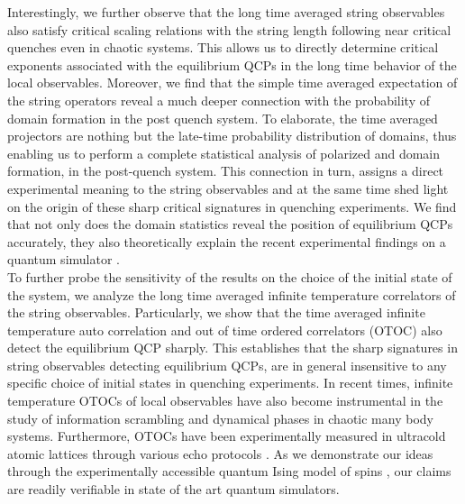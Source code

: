 \documentclass[aps,prx,twocolumn]{revtex4-2}
\begin{document}
 Interestingly, we further observe that the long time averaged string observables also satisfy critical scaling relations with the string length  following near critical quenches even in chaotic systems. This allows us to directly determine critical exponents associated with the equilibrium QCPs in the long time behavior of the local observables. Moreover, we find that the simple time averaged expectation of the string operators reveal a much deeper connection with the probability of domain formation in the post quench system. To elaborate, the time averaged projectors are nothing but the late-time probability distribution of domains, thus enabling us to perform a complete statistical analysis of polarized and   domain formation, in the post-quench system. This connection in turn, assigns a direct experimental meaning to the string observables and at the same time shed light on the origin of these sharp critical signatures in quenching experiments. We find that not only does the domain statistics reveal the position of equilibrium QCPs accurately, they also theoretically explain the recent experimental findings \cite{Zhang2017} on a quantum simulator \cite{monroe03}.\\
 
  To further probe the sensitivity of the results on the choice of the initial state of the system, we analyze the long time averaged infinite temperature correlators of the string observables. Particularly, we show that the time averaged infinite temperature auto correlation and out of time ordered correlators (OTOC) also detect the equilibrium QCP sharply. This establishes that the sharp signatures in string observables detecting equilibrium QCPs, are in general insensitive to any specific choice of initial states in quenching experiments. In recent times, infinite temperature OTOCs of local observables have also become instrumental in the study of information scrambling \cite{maldacena16,swingle19,swingle20} and dynamical phases \cite{pol21} in chaotic many body systems. Furthermore, OTOCs have been experimentally measured in ultracold atomic lattices through various echo protocols \cite{patrick16,silva20,fine14,tarek15,lewis19,nie20}. As we demonstrate our ideas through the experimentally accessible quantum Ising model of spins \cite{bloch17}, our claims are readily verifiable in state of the art quantum simulators. \\
\end{document}
